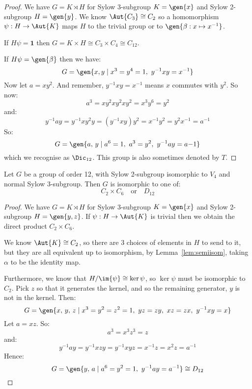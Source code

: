 \begin{proof}
    We have \(G = K \rtimes H\) for Sylow 3-subgroup \(K = \gen{x}\) and Sylow 2-subgroup \(H = \gen{y}\).
    We know \(\Aut{C_3} \cong C_2\) so a homomorphism \(\psi:H \to \Aut{K}\) maps \(H\) to the trivial group or to \(\gen{\beta:x
    \mapsto x^{-1}}\).

    If \(H\psi = \bm{1}\) then \(G = K \times H \cong C_3 \times C_4 \cong C_{12}\).

    If \(H\psi = \gen{\beta}\) then we have:
    \[G = \gen{x, y \mid x^3 = y^4 = 1,\ y^{-1}xy = x^{-1}}\]
    Now let \(a = xy^2\).
    And remember, \(y^{-1}xy = x^{-1}\) means \(x\) commutes with \(y^2\).
    So now:
    \[a^3 = xy^2xy^2xy^2 = x^3y^6 = y^2\]
    and:
    \[y^{-1}ay = y^{-1}xy^2y = (y^{-1}xy)y^2 = x^{-1}y^2 = y^2x^{-1} = a^{-1}\]
    So:
    \[G = \gen{a,\,y \mid a^6 = 1,\ a^3 = y^2,\ y^{-1}ay = a{-1}}\]
    which we recognise as \(\Dic_{12}\).
    This group is also sometimes denoted by \(T\).
\end{proof}

\begin{lemma}
    Let \(G\) be a group of order 12, with Sylow 2-subgroup isomorphic to \(V_4\) and normal Sylow 3-subgroup.
    Then \(G\) is isomorphic to one of:
    \[
        C_2 \times C_6 \quad \text{or} \quad%
        D_{12}
    \]

\end{lemma}

\begin{proof}
    We have \(G = K \rtimes H\) for Sylow 3-subgroup \(K = \gen{x}\) and Sylow 2-subgroup \(H = \gen{y, z}\).
    If \(\psi:H \to \Aut{K}\) is trivial then we obtain the direct product \(C_2 \times C_6\).

    We know \(\Aut{K} \cong C_2\), so there are 3 choices of elements in \(H\) to send to it, but they are all
    equivalent up to isomorphism, by Lemma~\ref{lem:semiisom}, taking \(\alpha\) to be the identity map.

    Furthermore, we know that \(H / \im{\psi} \cong \ker{\psi}\), so \(\ker{\psi}\) must be isomorphic to \(C_2\).
    Pick \(z\) so that it generates the kernel, and so the remaining generator, \(y\) is not in the kernel.
    Then:
    \[G = \gen{x,\,y,\,z \mid x^3 = y^2 = z^2 = 1,\ yz = zy,\ xz = zx,\ y^{-1}xy = x}\]
    Let \(a = xz\).
    So:
    \[a^3 = x^3z^3 = z\]
    and:
    \[ y^{-1}ay = y^{-1}xzy = y^{-1}xyz = x^{-1}z = x^2z = a^{-1}\]
    Hence:
    \[G = \gen{y,\,a \mid a^6 = y^2 = 1,\ y^{-1}ay = a^{-1}} \cong D_{12}\]
\end{proof}

